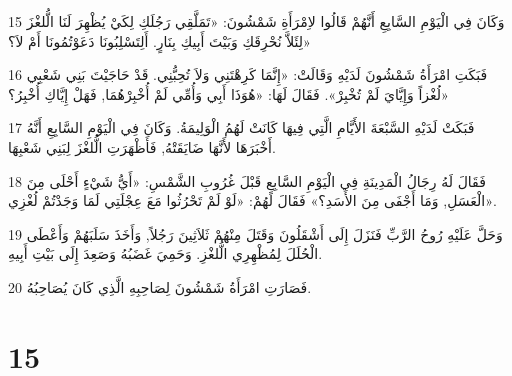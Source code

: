 \par 15 وَكَانَ فِي الْيَوْمِ السَّابِعِ أَنَّهُمْ قَالُوا لاِمْرَأَةِ شَمْشُونَ: «تَمَلَّقِي رَجُلَكِ لِكَيْ يُظْهِرَ لَنَا الُّلغْزَ لِئَلاَّ نُحْرِقَكِ وَبَيْتَ أَبِيكِ بِنَارٍ. أَلِتَسْلِبُونَا دَعَوْتُمُونَا أَمْ لاَ؟»
\par 16 فَبَكَتِ امْرَأَةُ شَمْشُونَ لَدَيْهِ وَقَالَتْ: «إِنَّمَا كَرِهْتَنِي وَلاَ تُحِبُّنِي. قَدْ حَاجَيْتَ بَنِي شَعْبِي لُغْزاً وَإِيَّايَ لَمْ تُخْبِرْ». فَقَالَ لَهَا: «هُوَذَا أَبِي وَأُمِّي لَمْ أُخْبِرْهُمَا, فَهَلْ إِيَّاكِ أُخْبِرُ؟»
\par 17 فَبَكَتْ لَدَيْهِ السَّبْعَةَ الأَيَّامِ الَّتِي فِيهَا كَانَتْ لَهُمُ الْوَلِيمَةُ. وَكَانَ فِي الْيَوْمِ السَّابِعِ أَنَّهُ أَخْبَرَهَا لأَنَّهَا ضَايَقَتْهُ, فَأَظْهَرَتِ الُّلغْزَ لِبَنِي شَعْبِهَا.
\par 18 فَقَالَ لَهُ رِجَالُ الْمَدِينَةِ فِي الْيَوْمِ السَّابِعِ قَبْلَ غُرُوبِ الشَّمْسِ: «أَيُّ شَيْءٍ أَحْلَى مِنَ الْعَسَلِ, وَمَا أَجْفَى مِنَ الأَسَدِ؟» فَقَالَ لَهُمْ: «لَوْ لَمْ تَحْرُثُوا مَعَ عِجْلَتِي لَمَا وَجَدْتُمْ لُغْزِي».
\par 19 وَحَلَّ عَلَيْهِ رُوحُ الرَّبِّ فَنَزَلَ إِلَى أَشْقَلُونَ وَقَتَلَ مِنْهُمْ ثَلاَثِينَ رَجُلاً, وَأَخَذَ سَلَبَهُمْ وَأَعْطَى الْحُلَلَ لِمُظْهِرِي الُّلغْزِ. وَحَمِيَ غَضَبُهُ وَصَعِدَ إِلَى بَيْتِ أَبِيهِ.
\par 20 فَصَارَتِ امْرَأَةُ شَمْشُونَ لِصَاحِبِهِ الَّذِي كَانَ يُصَاحِبُهُ.

\chapter{15}

